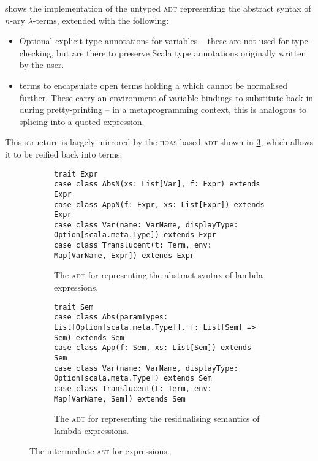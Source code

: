 \documentclass[../../../main.tex]{subfiles}
\begin{document}
%
 shows the implementation of the untyped  \textsc{adt} representing the abstract syntax of $n$-ary $\lambda$-terms, extended with the following:
\begin{itemize}
  \item Optional explicit type annotations for variables -- these are not used for type-checking, but are there to preserve Scala type annotations originally written by the user.
  \item {} terms to encapsulate open terms holding a  which cannot be normalised further. These carry an environment of variable bindings to substitute back in during pretty-printing -- in a metaprogramming context, this is analogous to splicing into a quoted expression.
\end{itemize}
This structure is largely mirrored by the \textsc{hoas}-based  \textsc{adt} shown in \cref{fig:sem-adt}, which allows it to be reified back into  terms.

\begin{figure}
\begin{subfigure}{\textwidth}
\begin{verbatim}
trait Expr
case class AbsN(xs: List[Var], f: Expr) extends Expr
case class AppN(f: Expr, xs: List[Expr]) extends Expr
case class Var(name: VarName, displayType: Option[scala.meta.Type]) extends Expr
case class Translucent(t: Term, env: Map[VarName, Expr]) extends Expr
\end{verbatim}
\caption{The  \textsc{adt} for representing the abstract syntax of lambda expressions.}
\label{fig:expr-adt}
\end{subfigure}
%
\begin{subfigure}{\textwidth}
\vspace{3ex}
\begin{verbatim}
trait Sem
case class Abs(paramTypes: List[Option[scala.meta.Type]], f: List[Sem] => Sem) extends Sem
case class App(f: Sem, xs: List[Sem]) extends Sem
case class Var(name: VarName, displayType: Option[scala.meta.Type]) extends Sem
case class Translucent(t: Term, env: Map[VarName, Sem]) extends Sem
\end{verbatim}
\caption{The  \textsc{adt} for representing the residualising semantics of lambda expressions.}
\label{fig:sem-adt}
\end{subfigure}
\caption{The intermediate \textsc{ast} for expressions.}
\end{figure}
\end{document}
